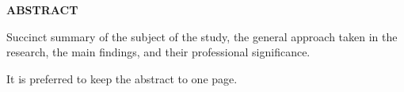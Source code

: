 \begin{center}
    {\fontsize{18pt}{0pt} \MakeUppercase{\textbf{abstract}}}
    \vspace*{24pt}
\end{center}


Succinct summary of the subject of the study, the general approach taken in the research, the main findings, and their professional significance.

It is preferred to keep the abstract to one page.

